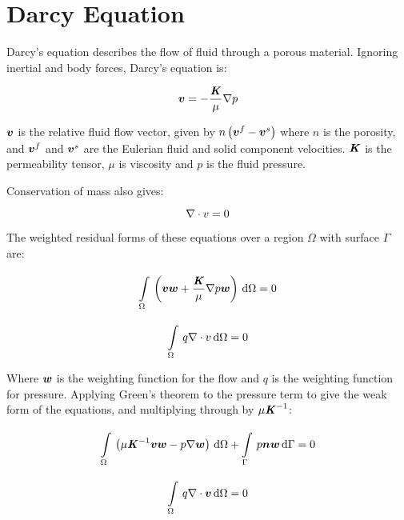 \section{Darcy Equation}

Darcy's equation describes the flow of fluid through a porous material. Ignoring inertial
and body forces, Darcy's equation is:

\begin{equation}
  \vectr{v} = -\frac{\tensor{K}}{\mu} \gradient{}{p}
\end{equation}

$ \boldsymbol{v} $ is the relative fluid flow vector, given by
$n \left(  \boldsymbol{v} ^f -  \boldsymbol{v} ^s \right)$ where $n$ is the porosity, and
$ \boldsymbol{v} ^f$ and $ \boldsymbol{v} ^s$ are the Eulerian fluid and solid component
velocities.  $\boldsymbol{\mathit{K}}$ is the permeability tensor, $\mu$ is viscosity and
$p$ is the fluid pressure.

Conservation of mass also gives:

\begin{equation}
  \divergence{}{v} = 0
\end{equation}

The weighted residual forms of these equations over a region $\Omega$ with surface $\Gamma$ are:

\begin{equation}
  \gint{\Omega}{}{\pbrac{\vectr{v} \vectr{w} + \frac{\tensor{K}}{\mu}\gradient{}{p}\vectr{w}}}{\Omega} = 0
\end{equation}

\begin{equation}
  \gint{\Omega}{}{q \divergence{}{v}}{\Omega} = 0
\end{equation}

Where $ \boldsymbol{w} $ is the weighting function for the flow and $q$ is the weighting function
for pressure.
Applying Green's theorem to the pressure term to give the weak form of the equations, and multiplying through by
$\mu {\ensuremath{\boldsymbol{\mathit{K}}}}^{-1}$:

\begin{equation}
  \gint{\Omega}{}{\pbrac{\mu \inverse{\tensor{K}} \vectr{v} \vectr{w} - p \gradient{}{\vectr{w}}}}{\Omega}  + %
  \gint{\Gamma}{}{p \vectr{n} \vectr{w}}{\Gamma}= 0
\end{equation}

\begin{equation}
  \gint{\Omega}{}{q \divergence{}{\vectr{v}}}{\Omega}= 0
\end{equation}

